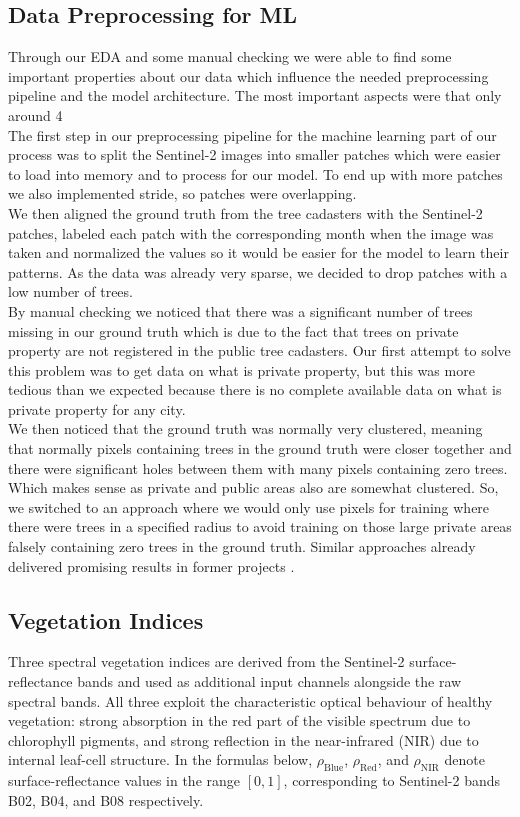 \subsection{Data Preprocessing for ML}
Through our EDA and some manual checking we were able to find some important properties about our data which influence the needed preprocessing pipeline and the model architecture. The most important aspects were that only around 4%
\\
The first step in our preprocessing pipeline for the machine learning part of our process was to split the Sentinel-2 images into smaller patches which were easier to load into memory and to process for our model. To end up with more patches we also implemented stride, so patches were overlapping. 
\\
We then aligned the ground truth from the tree cadasters with the Sentinel-2 patches, labeled each patch with the corresponding month when the image was taken and normalized the values so it would be easier for the model to learn their patterns. As the data was already very sparse, we decided to drop patches with a low number of trees.
\\
By manual checking we noticed that there was a significant number of trees missing in our ground truth which is due to the fact that trees on private property are not registered in the public tree cadasters. Our first attempt to solve this problem was to get data on what is private property, but this was more tedious than we expected because there is no complete available data on what is private property for any city. 
\\
We then noticed that the ground truth was normally very clustered, meaning that normally pixels containing trees in the ground truth were closer together and there were significant holes between them with many pixels containing zero trees. Which makes sense as private and public areas also are somewhat clustered. So, we switched to an approach where we would only use pixels for training where there were trees in a specified radius to avoid training on those large private areas falsely containing zero trees in the ground truth. Similar approaches already delivered promising results in former projects \cite{lin2016scribblesup}.

\subsection{Vegetation Indices}
Three spectral vegetation indices are derived from the Sentinel-2 surface-reflectance bands and used as additional input channels alongside the raw spectral bands. All three exploit the characteristic optical behaviour of healthy vegetation: strong absorption in the red part of the visible spectrum due to chlorophyll pigments, and strong reflection in the near-infrared (NIR) due to internal leaf-cell structure. In the formulas below, $\rho_{\text{Blue}}$, $\rho_{\text{Red}}$, and $\rho_{\text{NIR}}$ denote surface-reflectance values in the range $[0, 1]$, corresponding to Sentinel-2 bands B02, B04, and B08 respectively.

